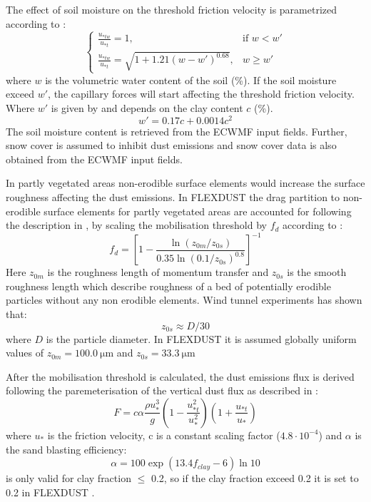 The effect of soil moisture on the threshold friction velocity is parametrized according to \textcite{fecan1998parametrization}:
\begin{equation}
    \begin{cases}
    \frac{u_{*tw}}{u_{*t}}=1, & \text{if } w < w' \\
    \frac{u_{*tw}}{u_{*t}}=\sqrt{1+1.21(w-w')^{0.68}}, & w \geq w'
    \end{cases}
\end{equation}
where $w$ is the volumetric water content of the soil (\%). If the soil moisture exceed $w'$, the capillary 
forces will start affecting the threshold friction velocity. Where $w'$ is given by  
and depends on the clay content $c$ (\%).   
\begin{equation} \label{eq:moisture_clay}
    w' = 0.17c + 0.0014c^2
\end{equation}
The soil moisture content is retrieved from the ECWMF input fields. Further, snow cover is 
assumed to inhibit dust emissions and snow cover data is also obtained from the ECWMF input fields. 
\par In partly vegetated areas non-erodible surface elements would increase the surface 
roughness affecting the dust emissions. In FLEXDUST the drag partition to non-erodible 
surface elements for partly vegetated areas are accounted for following the description in 
\parencite{zender2003mineral}, by scaling the mobilisation threshold by $f_d$ according to :
\begin{equation}\label{eq:drag_partition}
    f_d = \left[1 - \frac{\ln (z_{0m}/z_{0s})}{0.35\ln (0.1/z_{0s})^{0.8}}\right]^{-1}
\end{equation}
Here $z_{0m}$ is the roughness length of momentum transfer and $z_{0s}$ is the smooth roughness length which 
describe roughness of a bed of potentially erodible particles without any non erodible elements. Wind tunnel 
experiments has shown that: 
\begin{equation}
    z_{0s} \approx D/30
\end{equation}
where $D$ is the particle diameter. In FLEXDUST it is assumed globally uniform values of  $z_{0m}=\SI{100.0}{\micro\metre}$ and $z_{0s}=\SI{33.3}{\micro\metre}$

After the mobilisation threshold is calculated,  the dust emissions flux is derived following the paremeterisation of the vertical dust flux as described in \textcite{MB95_dust_emission}: 
\begin{equation}
    F=c\alpha \frac{\rho u_{*}^3}{g}\left(1-\frac{u^2_{*t}}{u^2_*}\right)\left(1+ \frac{u_{*t}}{u_*}\right)
\end{equation}
where $u_*$ is the friction velocity, c is a constant scaling factor ($4.8\cdot 10^{-4}$) and $\alpha$ is the sand blasting efficiency:
\begin{equation}\label{eq:sand_blasing_eff}
    \alpha = 100\exp{(13.4f_{clay}-6)\ln 10}
\end{equation}
 is only valid for clay fraction $\leq$ 0.2, so if the clay fraction exceed 0.2 it is set to 0.2 in FLEXDUST \parencite{zender2003mineral}. 

